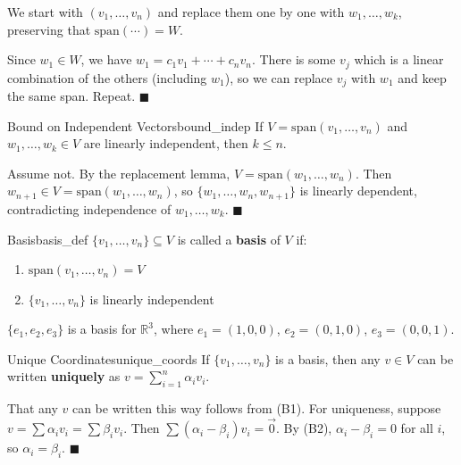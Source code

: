 \documentclass[11pt, letterpaper, openany]{book}
\renewenvironment{proof}[1][\proofname]{%
  \tcolorbox[blanker, breakable, left=1em,
    before skip=1em, after skip=1em,
    borderline west={2pt}{0pt}{MagicTeal!50},
    colback=MagicCream,
    before upper={\textcolor{MagicTeal}{\sffamily\bfseries #1.}\space}
  ]%
}{%
  \hfill\textcolor{MagicTeal}{\ensuremath{\blacksquare}}\endtcolorbox%
}
\begin{document}
\begin{proof}[Sketch]
We start with $(v_1, \ldots, v_n)$ and replace them one by one with $w_1, \ldots, w_k$, preserving that $\text{span}(\cdots) = W$.

Since $w_1 \in W$, we have $w_1 = c_1 v_1 + \cdots + c_n v_n$. There is some $v_j$ which is a linear combination of the others (including $w_1$), so we can replace $v_j$ with $w_1$ and keep the same span. Repeat.
\end{proof}

\begin{lem}{Bound on Independent Vectors}{bound_indep}
If $V = \text{span}(v_1, \ldots, v_n)$ and $w_1, \ldots, w_k \in V$ are linearly independent, then $k \leq n$.
\end{lem}

\begin{proof}
Assume not. By the replacement lemma, $V = \text{span}(w_1, \ldots, w_n)$. Then $w_{n+1} \in V = \text{span}(w_1, \ldots, w_n)$, so $\{w_1, \ldots, w_n, w_{n+1}\}$ is linearly dependent, contradicting independence of $w_1, \ldots, w_k$.
\end{proof}

\begin{defn}{Basis}{basis_def}
$\{v_1, \ldots, v_n\} \subseteq V$ is called a \textbf{basis} of $V$ if:
\begin{enumerate}
    \item[(B1)] $\text{span}(v_1, \ldots, v_n) = V$
    \item[(B2)] $\{v_1, \ldots, v_n\}$ is linearly independent
\end{enumerate}
\end{defn}

\begin{example}
$\{e_1, e_2, e_3\}$ is a basis for $\mathbb{R}^3$, where $e_1 = (1,0,0)$, $e_2 = (0,1,0)$, $e_3 = (0,0,1)$.
\end{example}

\begin{lem}{Unique Coordinates}{unique_coords}
If $\{v_1, \ldots, v_n\}$ is a basis, then any $v \in V$ can be written \textbf{uniquely} as $v = \sum_{i=1}^n \alpha_i v_i$.
\end{lem}

\begin{proof}
That any $v$ can be written this way follows from (B1). For uniqueness, suppose $v = \sum \alpha_i v_i = \sum \beta_i v_i$. Then $\sum(\alpha_i - \beta_i) v_i = \vec{0}$. By (B2), $\alpha_i - \beta_i = 0$ for all $i$, so $\alpha_i = \beta_i$.
\end{proof}
\end{document}
